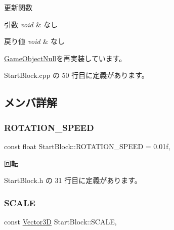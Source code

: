 更新関数 


\begin{DoxyParams}{引数}
{\em void} & なし \\
\hline
\end{DoxyParams}

\begin{DoxyRetVals}{戻り値}
{\em void} & なし \\
\hline
\end{DoxyRetVals}


\mbox{\hyperlink{class_game_object_null_aeeb51b7e7aa41fd0b16f8f7c016bdb55}{Game\+Object\+Null}}を再実装しています。



 Start\+Block.\+cpp の 50 行目に定義があります。



\subsection{メンバ詳解}
\mbox{\label{class_start_block_a8c5f2b6217db28715cd0d3532849cc54}} 
\subsubsection{\texorpdfstring{R\+O\+T\+A\+T\+I\+O\+N\+\_\+\+S\+P\+E\+ED}{ROTATION\_SPEED}}
{\footnotesize\ttfamily const float Start\+Block\+::\+R\+O\+T\+A\+T\+I\+O\+N\+\_\+\+S\+P\+E\+ED = 0.\+01f\hspace{0.3cm}{\ttfamily [static]}, {\ttfamily [private]}}



回転 



 Start\+Block.\+h の 31 行目に定義があります。

\mbox{\label{class_start_block_ad23708a631130ebcf6e40cf4f2afcd90}} 
\subsubsection{\texorpdfstring{S\+C\+A\+LE}{SCALE}}
{\footnotesize\ttfamily const \mbox{\hyperlink{class_vector3_d}{Vector3D}} Start\+Block\+::\+S\+C\+A\+LE\hspace{0.3cm}{\ttfamily [static]}, {\ttfamily [private]}}



